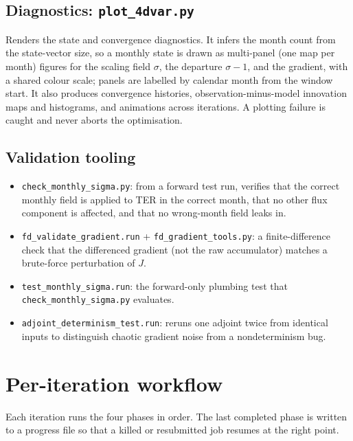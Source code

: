 \documentclass[11pt]{article}
\newcommand{\code}[1]{\texttt{#1}}
\begin{document}
\subsection{Diagnostics: \code{plot\_4dvar.py}}

Renders the state and convergence diagnostics. It infers the month count from the
state-vector size, so a monthly state is drawn as multi-panel (one map per month)
figures for the scaling field $\sigma$, the departure $\sigma-1$, and the
gradient, with a shared colour scale; panels are labelled by calendar month from
the window start. It also produces convergence histories, observation-minus-model
innovation maps and histograms, and animations across iterations. A plotting
failure is caught and never aborts the optimisation.

\subsection{Validation tooling}

\begin{itemize}[nosep]
  \item \code{check\_monthly\_sigma.py}: from a forward test run, verifies that
        the correct monthly field is applied to TER in the correct month, that no
        other flux component is affected, and that no wrong-month field leaks in.
  \item \code{fd\_validate\_gradient.run} + \code{fd\_gradient\_tools.py}: a
        finite-difference check that the differenced gradient (not the raw
        accumulator) matches a brute-force perturbation of $J$.
  \item \code{test\_monthly\_sigma.run}: the forward-only plumbing test that
        \code{check\_monthly\_sigma.py} evaluates.
  \item \code{adjoint\_determinism\_test.run}: reruns one adjoint twice from
        identical inputs to distinguish chaotic gradient noise from a
        nondeterminism bug.
\end{itemize}

\section{Per-iteration workflow}
\label{sec:workflow}

Each iteration runs the four phases in order. The last completed phase is written
to a progress file so that a killed or resubmitted job resumes at the right point.
\end{document}
